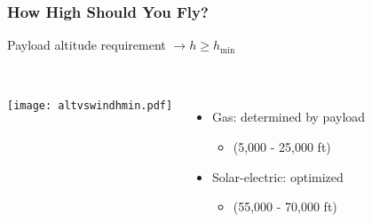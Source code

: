\documentclass{beamer}
\begin{document}
\begin{frame}
    \frametitle{How High Should You Fly?}

    \pause
    Payload altitude requirement $\rightarrow h \geq h_{\text{min}}$ \\~\\

    \pause
    \begin{columns}
        \texttt{[image: altvswindhmin.pdf]}

        \pause
        
        \begin{itemize}
            \item Gas: determined by payload
                \begin{itemize}
                    \item (5,000 - 25,000 ft)
                    \end{itemize}
                    \pause
            \item Solar-electric: optimized 
                \begin{itemize}
                    \item (55,000 - 70,000 ft)
                    \end{itemize}
                \end{itemize}
        
    \end{columns}

\end{frame}
\end{document}
